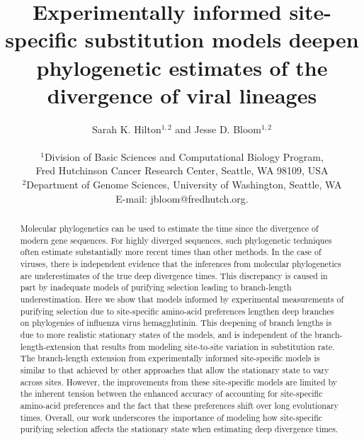 \documentclass[11pt]{article}
\title{Experimentally informed site-specific substitution models deepen phylogenetic estimates of the divergence of viral lineages}
\author
{Sarah K. Hilton$^{1,2}$  and Jesse D. Bloom$^{1,2}$\\
\\
\normalsize{$^1$Division of Basic Sciences and Computational Biology Program,}\\
\normalsize{Fred Hutchinson Cancer Research Center, Seattle, WA 98109, USA}\\
\normalsize{$^2$Department of Genome Sciences, University of Washington, Seattle, WA}\\
\normalsize{E-mail:  jbloom@fredhutch.org.}\\
}
\date{}
\begin{document}
 


\maketitle 


\begin{abstract}
\noindent  
Molecular phylogenetics can be used to estimate the time since the divergence of modern gene sequences.
For highly diverged sequences, such phylogenetic techniques often estimate substantially more recent times than other methods.
In the case of viruses, there is independent evidence that the inferences from molecular phylogenetics are underestimates of the true deep divergence times.  
This discrepancy is caused in part by inadequate models of purifying selection leading to branch-length underestimation.
Here we show that models informed by experimental measurements of purifying selection due to site-specific amino-acid preferences lengthen deep branches on phylogenies of influenza virus hemagglutinin.
This deepening of branch lengths is due to more realistic stationary states of the models, and is independent of the branch-length-extension that results from modeling site-to-site variation in substitution rate.
The branch-length extension from experimentally informed site-specific models is similar to that achieved by other approaches that allow the stationary state to vary across sites.
However, the improvements from these site-specific models are limited by the inherent tension between the enhanced accuracy of accounting for site-specific amino-acid preferences and the fact that these preferences shift over long evolutionary times.
Overall, our work underscores the importance of modeling how site-specific purifying selection affects the stationary state when estimating deep divergence times. 
\end{abstract}

\clearpage
\end{document}
